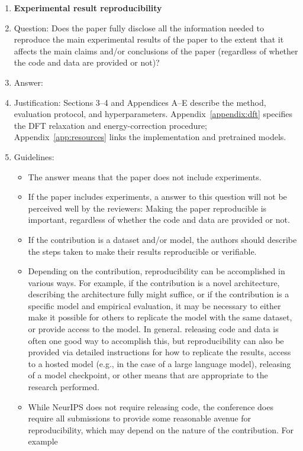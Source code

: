 \documentclass{article}
\theoremstyle{plain}
\theoremstyle{definition}
\theoremstyle{remark}
\begin{document}
\begin{enumerate}
    \item {\bf Experimental result reproducibility}
    \item[] Question: Does the paper fully disclose all the information needed to reproduce the main experimental results of the paper to the extent that it affects the main claims and/or conclusions of the paper (regardless of whether the code and data are provided or not)?
    \item[] Answer: \answerYes{} %
    \item[] Justification: Sections 3--4 and Appendices A--E describe the method, evaluation protocol, and hyperparameters. Appendix~\ref{appendix:dft} specifies the DFT relaxation and energy-correction procedure; Appendix~\ref{app:resources} links the implementation and pretrained models.
    \item[] Guidelines:
    \begin{itemize}
        \item The answer \answerNA{} means that the paper does not include experiments.
        \item If the paper includes experiments, a \answerNo{} answer to this question will not be perceived well by the reviewers: Making the paper reproducible is important, regardless of whether the code and data are provided or not.
        \item If the contribution is a dataset and\slash or model, the authors should describe the steps taken to make their results reproducible or verifiable. 
        \item Depending on the contribution, reproducibility can be accomplished in various ways. For example, if the contribution is a novel architecture, describing the architecture fully might suffice, or if the contribution is a specific model and empirical evaluation, it may be necessary to either make it possible for others to replicate the model with the same dataset, or provide access to the model. In general. releasing code and data is often one good way to accomplish this, but reproducibility can also be provided via detailed instructions for how to replicate the results, access to a hosted model (e.g., in the case of a large language model), releasing of a model checkpoint, or other means that are appropriate to the research performed.
        \item While NeurIPS does not require releasing code, the conference does require all submissions to provide some reasonable avenue for reproducibility, which may depend on the nature of the contribution. For example

\end{itemize}
\end{enumerate}
\end{document}
